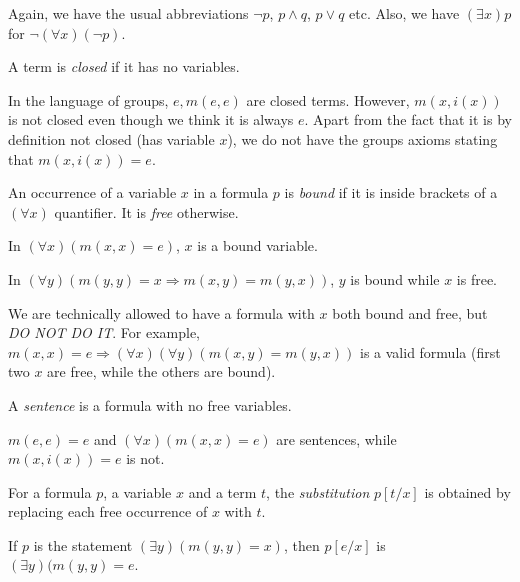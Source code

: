 \documentclass[a4paper]{article}
\begin{document}
Again, we have the usual abbreviations $\neg p$, $p\wedge q$, $p\vee q$ etc.  Also, we have $(\exists x)p$ for $\neg(\forall x)(\neg p)$.

\begin{defi}
  A term is \emph{closed} if it has no variables.
\end{defi}

\begin{eg}
  In the language of groups, $e, m(e, e)$ are closed terms. However, $m(x, i(x))$ is not closed even though we think it is always $e$. Apart from the fact that it is by definition not closed (has variable $x$), we do not have the groups axioms stating that $m(x, i(x)) = e$.
\end{eg}

\begin{defi}
  An occurrence of a variable $x$ in a formula $p$ is \emph{bound} if it is inside brackets of a $(\forall x)$ quantifier. It is \emph{free} otherwise.
\end{defi}

\begin{eg}
  In $(\forall x)(m(x, x) = e)$, $x$ is a bound variable.

  In $(\forall y)(m(y, y) = x \Rightarrow m(x, y) = m(y, x))$, $y$ is bound while $x$ is free.

  We are technically allowed to have a formula with $x$ both bound and free, but \emph{DO NOT DO IT}. For example, $m(x, x) = e \Rightarrow (\forall x)(\forall y)(m(x, y) = m(y, x))$ is a valid formula (first two $x$ are free, while the others are bound).
\end{eg}

\begin{defi}[Sentence]
  A \emph{sentence} is a formula with no free variables.
\end{defi}

\begin{eg}
  $m(e, e) = e$ and $(\forall x)(m(x, x) = e)$ are sentences, while $m(x, i(x)) = e$ is not.
\end{eg}

\begin{defi}[Substitution]
  For a formula $p$, a variable $x$ and a term $t$, the \emph{substitution} $p[t/x]$ is obtained by replacing each free occurrence of $x$ with $t$.
\end{defi}

\begin{eg}
  If $p$ is the statement $(\exists y)(m(y, y) = x)$, then $p[e/x]$ is $(\exists y)(m(y, y) = e$.
\end{eg}
\end{document}
